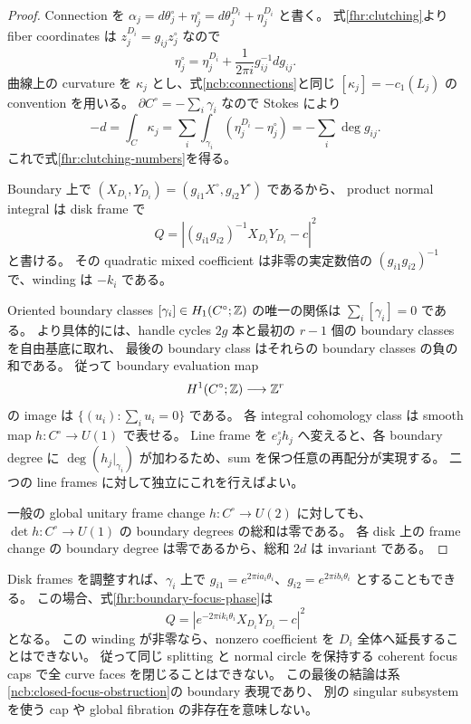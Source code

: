\begin{proof}
Connection を $\alpha_j=d\theta_j^\circ+\eta_j^\circ=d\theta_j^{D_i}+\eta_j^{D_i}$ と書く。
式\eqref{fhr:clutching}より fiber coordinates は $z_j^{D_i}=g_{ij}z_j^\circ$ なので
\[
 \eta_j^\circ=\eta_j^{D_i}+\frac{1}{2\pi i}g_{ij}^{-1}dg_{ij}.
\]
曲線上の curvature を $\kappa_j$ とし、式\eqref{ncb:connections}と同じ
$[\kappa_j]=-c_1(L_j)$ の convention を用いる。
$\partial C^\circ=-\sum_i\gamma_i$ なので Stokes により
\[
 -d=\int_C\kappa_j
 =\sum_i\int_{\gamma_i}(\eta_j^{D_i}-\eta_j^\circ)
 =-\sum_i\deg g_{ij}.
\]
これで式\eqref{fhr:clutching-numbers}を得る。

Boundary 上で $(X_{D_i},Y_{D_i})=(g_{i1}X^\circ,g_{i2}Y^\circ)$ であるから、
product normal integral は disk frame で
\begin{equation}\label{fhr:boundary-focus-phase}
 Q=\left|(g_{i1}g_{i2})^{-1}X_{D_i}Y_{D_i}-c\right|^2
\end{equation}
と書ける。
その quadratic mixed coefficient は非零の実定数倍の $(g_{i1}g_{i2})^{-1}$ で、winding は $-k_i$ である。

Oriented boundary classes $[\gamma_i]\in H_1(C^\circ;\mathbb Z)$ の唯一の関係は $\sum_i[\gamma_i]=0$ である。
より具体的には、handle cycles $2g$ 本と最初の $r-1$ 個の boundary classes を自由基底に取れ、
最後の boundary class はそれらの boundary classes の負の和である。
従って boundary evaluation map
\[
 H^1(C^\circ;\mathbb Z)\longrightarrow\mathbb Z^r
\]
の image は $\{(u_i):\sum_i u_i=0\}$ である。
各 integral cohomology class は smooth map $h:C^\circ\to U(1)$ で表せる。
Line frame を $e_j^\circ h_j$ へ変えると、各 boundary degree に
$\deg(h_j|_{\gamma_i})$ が加わるため、sum を保つ任意の再配分が実現する。
二つの line frames に対して独立にこれを行えばよい。

一般の global unitary frame change $h:C^\circ\to U(2)$ に対しても、
$\det h:C^\circ\to U(1)$ の boundary degrees の総和は零である。
各 disk 上の frame change の boundary degree は零であるから、総和 $2d$ は invariant である。
\end{proof}

Disk frames を調整すれば、$\gamma_i$ 上で
$g_{i1}=e^{2\pi ia_i\theta_i}$、$g_{i2}=e^{2\pi ib_i\theta_i}$ とすることもできる。
この場合、式\eqref{fhr:boundary-focus-phase}は
\[
 Q=\left|e^{-2\pi ik_i\theta_i}X_{D_i}Y_{D_i}-c\right|^2
\]
となる。
この winding が非零なら、nonzero coefficient を $D_i$ 全体へ延長することはできない。
従って同じ splitting と normal circle を保持する coherent focus caps で全 curve faces を閉じることはできない。
この最後の結論は系\ref{ncb:closed-focus-obstruction}の boundary 表現であり、
別の singular subsystem を使う cap や global fibration の非存在を意味しない。

